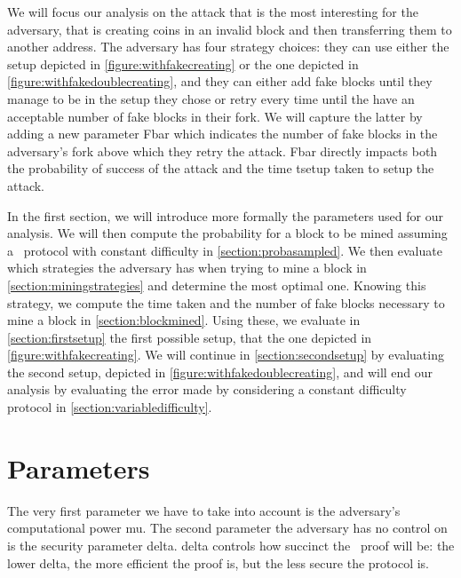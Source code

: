 We will focus our analysis on the attack that is the most interesting for the adversary, that is creating coins in an invalid block and then transferring them to another address. The adversary has four strategy choices: they can use either the setup depicted in \autoref{figure:withfakecreating} or the one depicted in \autoref{figure:withfakedoublecreating}, and they can either add fake blocks until they manage to be in the setup they chose or retry every time until the have an acceptable number of fake blocks in their fork. We will capture the latter by adding a new parameter \gls{Fbar} which indicates the number of fake blocks in the adversary's fork above which they retry the attack. \gls{Fbar} directly impacts both the probability of success of the attack and the time \gls{tsetup} taken to setup the attack.

In the first section, we will introduce more formally the parameters used for our analysis. We will then compute the probability for a block to be mined assuming a \FC\ protocol with constant difficulty in \autoref{section:probasampled}. We then evaluate which strategies the adversary has when trying to mine a block in \autoref{section:miningstrategies} and determine the most optimal one. Knowing this strategy, we compute the time taken and the number of fake blocks necessary to mine a block in \autoref{section:blockmined}. Using these, we evaluate in \autoref{section:firstsetup} the first possible setup, that the one depicted in \autoref{figure:withfakecreating}. We will continue in \autoref{section:secondsetup} by evaluating the second setup, depicted in \autoref{figure:withfakedoublecreating}, and will end our analysis by evaluating the error made by considering a constant difficulty protocol in \autoref{section:variabledifficulty}.

\section{Parameters}

The very first parameter we have to take into account is the adversary's computational power \gls{mu}. The second parameter the adversary has no control on is the security parameter \gls{delta}. \Gls{delta} controls how succinct the \FC\ proof will be: the lower \gls{delta}, the more efficient the proof is, but the less secure the protocol is.

